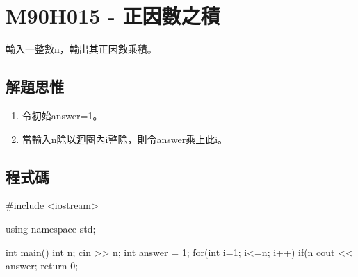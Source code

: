 \section{M90H015 - 正因數之積}
輸入一整數n，輸出其正因數乘積。
\subsection{解題思惟}
\begin{enumerate}
	\item 令初始answer=1。
	\item 當輸入n除以迴圈內i整除，則令answer乘上此i。
\end{enumerate}
\subsection{程式碼}
\begin{cppcode}
#include <iostream>

using namespace std;

int main()
{
	int n;
	cin >> n;
	int answer = 1;
	for(int i=1; i<=n; i++) {
		if(n%
	}
	cout << answer;
	return 0;
}
\end{cppcode}
